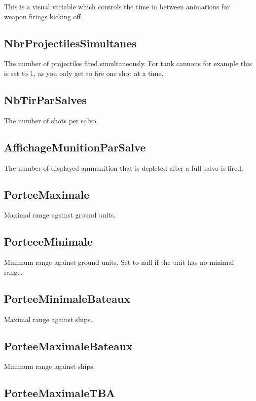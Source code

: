 \documentclass{article}
\begin{document}
This is a visual variable which controls the time in between animations for weapon firings kicking off.

\subsection{NbrProjectilesSimultanes}

The number of projectiles fired simultaneously. For tank cannons for example this is set to 1, as you only get to fire one shot at a time.

\subsection{NbTirParSalves}

The number of shots per salvo.

\subsection{AffichageMunitionParSalve}

The number of displayed ammunition that is depleted after a full salvo is fired.

\subsection{PorteeMaximale}

Maximal range against ground units.

\subsection{PorteeeMinimale}

Minimum range against ground units. Set to null if the unit has no minimal range.

\subsection{PorteeMinimaleBateaux}

Maximal range against ships.

\subsection{PorteeMaximaleBateaux}

Minimum range against ships.

\subsection{PorteeMaximaleTBA}
\end{document}
